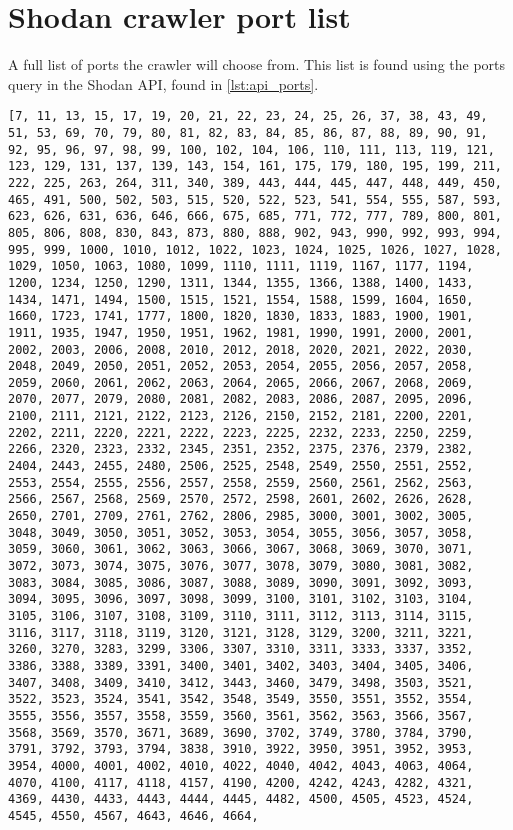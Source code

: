\section{Shodan crawler port list} \label{app:ports}
A full list of ports the crawler will choose from. This list is found using the ports query in the Shodan API, found in \cref{lst:api_ports}. 
\lstset{breaklines=true}
\begin{lstlisting}[basicstyle=\scriptsize]
    [7, 11, 13, 15, 17, 19, 20, 21, 22, 23, 24, 25, 26, 37, 38, 43, 49, 51, 53, 69, 70, 79, 80, 81, 82, 83, 84, 85, 86, 87, 88, 89, 90, 91, 92, 95, 96, 97, 98, 99, 100, 102, 104, 106, 110, 111, 113, 119, 121, 123, 129, 131, 137, 139, 143, 154, 161, 175, 179, 180, 195, 199, 211, 222, 225, 263, 264, 311, 340, 389, 443, 444, 445, 447, 448, 449, 450, 465, 491, 500, 502, 503, 515, 520, 522, 523, 541, 554, 555, 587, 593, 623, 626, 631, 636, 646, 666, 675, 685, 771, 772, 777, 789, 800, 801, 805, 806, 808, 830, 843, 873, 880, 888, 902, 943, 990, 992, 993, 994, 995, 999, 1000, 1010, 1012, 1022, 1023, 1024, 1025, 1026, 1027, 1028, 1029, 1050, 1063, 1080, 1099, 1110, 1111, 1119, 1167, 1177, 1194, 1200, 1234, 1250, 1290, 1311, 1344, 1355, 1366, 1388, 1400, 1433, 1434, 1471, 1494, 1500, 1515, 1521, 1554, 1588, 1599, 1604, 1650, 1660, 1723, 1741, 1777, 1800, 1820, 1830, 1833, 1883, 1900, 1901, 1911, 1935, 1947, 1950, 1951, 1962, 1981, 1990, 1991, 2000, 2001, 2002, 2003, 2006, 2008, 2010, 2012, 2018, 2020, 2021, 2022, 2030, 2048, 2049, 2050, 2051, 2052, 2053, 2054, 2055, 2056, 2057, 2058, 2059, 2060, 2061, 2062, 2063, 2064, 2065, 2066, 2067, 2068, 2069, 2070, 2077, 2079, 2080, 2081, 2082, 2083, 2086, 2087, 2095, 2096, 2100, 2111, 2121, 2122, 2123, 2126, 2150, 2152, 2181, 2200, 2201, 2202, 2211, 2220, 2221, 2222, 2223, 2225, 2232, 2233, 2250, 2259, 2266, 2320, 2323, 2332, 2345, 2351, 2352, 2375, 2376, 2379, 2382, 2404, 2443, 2455, 2480, 2506, 2525, 2548, 2549, 2550, 2551, 2552, 2553, 2554, 2555, 2556, 2557, 2558, 2559, 2560, 2561, 2562, 2563, 2566, 2567, 2568, 2569, 2570, 2572, 2598, 2601, 2602, 2626, 2628, 2650, 2701, 2709, 2761, 2762, 2806, 2985, 3000, 3001, 3002, 3005, 3048, 3049, 3050, 3051, 3052, 3053, 3054, 3055, 3056, 3057, 3058, 3059, 3060, 3061, 3062, 3063, 3066, 3067, 3068, 3069, 3070, 3071, 3072, 3073, 3074, 3075, 3076, 3077, 3078, 3079, 3080, 3081, 3082, 3083, 3084, 3085, 3086, 3087, 3088, 3089, 3090, 3091, 3092, 3093, 3094, 3095, 3096, 3097, 3098, 3099, 3100, 3101, 3102, 3103, 3104, 3105, 3106, 3107, 3108, 3109, 3110, 3111, 3112, 3113, 3114, 3115, 3116, 3117, 3118, 3119, 3120, 3121, 3128, 3129, 3200, 3211, 3221, 3260, 3270, 3283, 3299, 3306, 3307, 3310, 3311, 3333, 3337, 3352, 3386, 3388, 3389, 3391, 3400, 3401, 3402, 3403, 3404, 3405, 3406, 3407, 3408, 3409, 3410, 3412, 3443, 3460, 3479, 3498, 3503, 3521, 3522, 3523, 3524, 3541, 3542, 3548, 3549, 3550, 3551, 3552, 3554, 3555, 3556, 3557, 3558, 3559, 3560, 3561, 3562, 3563, 3566, 3567, 3568, 3569, 3570, 3671, 3689, 3690, 3702, 3749, 3780, 3784, 3790, 3791, 3792, 3793, 3794, 3838, 3910, 3922, 3950, 3951, 3952, 3953, 3954, 4000, 4001, 4002, 4010, 4022, 4040, 4042, 4043, 4063, 4064, 4070, 4100, 4117, 4118, 4157, 4190, 4200, 4242, 4243, 4282, 4321, 4369, 4430, 4433, 4443, 4444, 4445, 4482, 4500, 4505, 4523, 4524, 4545, 4550, 4567, 4643, 4646, 4664, 
\end{lstlisting}

